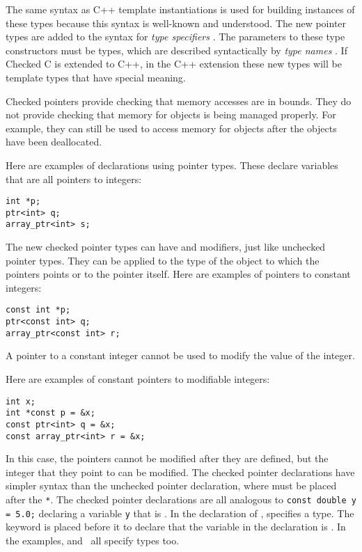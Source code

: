 The same syntax as C++ template instantiations is used for building
instances of these types because this syntax is well-known and
understood.  The new pointer types are added to the syntax for {\it type specifiers} 
\cite[Section 6.7.2]{ISO2011}. The parameters to these type constructors 
must be types, which are described syntactically by {\it type names}
\cite[Section 6.7.7]{ISO2011}.  If Checked C is extended to C++,
in the C++ extension these new types will be template types that have special meaning.

Checked pointers provide checking that memory accesses are in bounds.  They
do not provide checking that memory for objects is being managed
properly. For example, they can still be used to access memory for objects after
the objects have been deallocated.

Here are  examples of declarations using pointer types.   These declare variables that
are all pointers to integers:
\begin{lstlisting}
int *p;
ptr<int> q;
array_ptr<int> s;
\end{lstlisting}

The new checked pointer types can have  and 
modifiers, just like unchecked pointer types.   They can be applied to the type
of the object to which the pointers points or to the pointer itself.  Here are examples
of pointers to constant integers:
\begin{lstlisting}
const int *p;
ptr<const int> q;
array_ptr<const int> r;
\end{lstlisting}
A pointer to a constant integer cannot be used to modify the value of
the integer.

Here are examples of constant pointers to modifiable integers:
\begin{lstlisting}
int x;
int *const p = &x;
const ptr<int> q = &x;
const array_ptr<int> r = &x;
\end{lstlisting}
In this case, the pointers cannot be modified after they are defined, but 
the integer that they point to can be modified.   The checked pointer declarations 
have simpler syntax than the unchecked pointer declaration, where 
must be placed after the \lstinline+*+.   The checked pointer declarations are all analogous 
to \lstinline+const double y = 5.0;+ declaring a  variable \lstinline+y+ that is .
In the declaration of ,  specifies a type.
The  keyword is placed before it to declare that
the variable in the declaration is .  In the examples, \ptrint
and \arrayptrint\ all specify types too.

